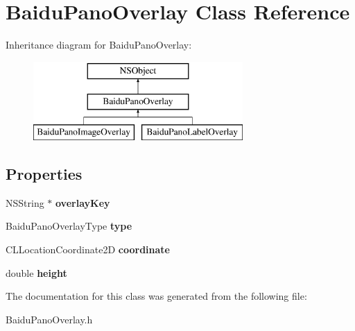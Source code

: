 \hypertarget{interface_baidu_pano_overlay}{}\section{Baidu\+Pano\+Overlay Class Reference}
\label{interface_baidu_pano_overlay}
Inheritance diagram for Baidu\+Pano\+Overlay\+:\begin{figure}[H]
\begin{center}
\leavevmode
\includegraphics[height=3.000000cm]{interface_baidu_pano_overlay}
\end{center}
\end{figure}
\subsection*{Properties}
\begin{DoxyCompactItemize}
\item 
\hypertarget{interface_baidu_pano_overlay_a2c203a7fd4ebddb58214ca77dcbf1262}{}N\+S\+String $\ast$ {\bfseries overlay\+Key}\label{interface_baidu_pano_overlay_a2c203a7fd4ebddb58214ca77dcbf1262}

\item 
\hypertarget{interface_baidu_pano_overlay_a6ca1f3d09a958965c71dbc1240d3ab1a}{}Baidu\+Pano\+Overlay\+Type {\bfseries type}\label{interface_baidu_pano_overlay_a6ca1f3d09a958965c71dbc1240d3ab1a}

\item 
\hypertarget{interface_baidu_pano_overlay_a6bccfe66044e00ced701bdd7f6df6da8}{}C\+L\+Location\+Coordinate2\+D {\bfseries coordinate}\label{interface_baidu_pano_overlay_a6bccfe66044e00ced701bdd7f6df6da8}

\item 
\hypertarget{interface_baidu_pano_overlay_accb25227ffa324c593ea49bbae4a1505}{}double {\bfseries height}\label{interface_baidu_pano_overlay_accb25227ffa324c593ea49bbae4a1505}

\end{DoxyCompactItemize}


The documentation for this class was generated from the following file\+:\begin{DoxyCompactItemize}
\item 
Baidu\+Pano\+Overlay.\+h\end{DoxyCompactItemize}

